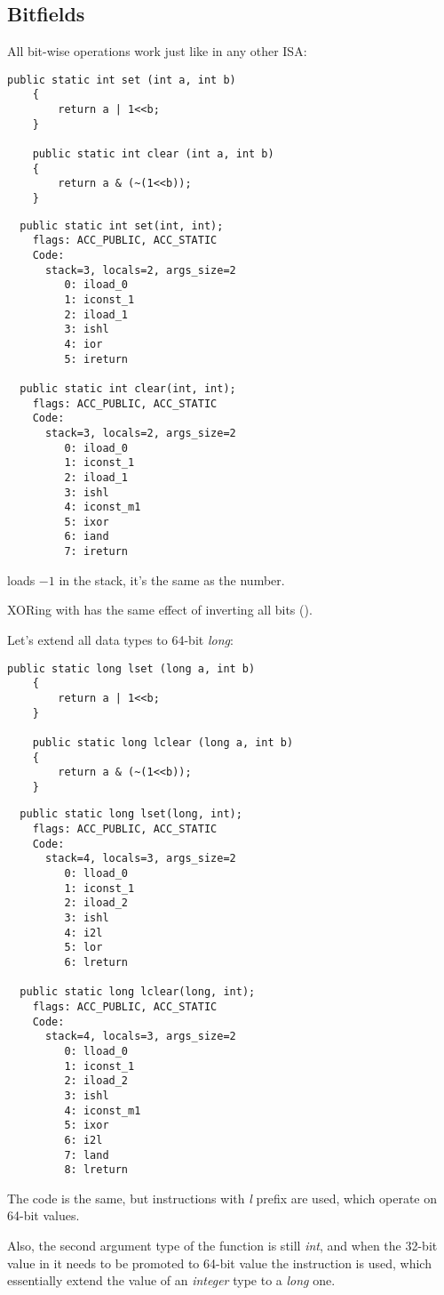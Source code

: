 \subsection{Bitfields}

All bit-wise operations work just like in any other \ac{ISA}:


\begin{lstlisting}[style=customjava]
	public static int set (int a, int b)
	{
		return a | 1<<b;
	}

	public static int clear (int a, int b)
	{
		return a & (~(1<<b));
	}
\end{lstlisting}

\begin{lstlisting}
  public static int set(int, int);
    flags: ACC_PUBLIC, ACC_STATIC
    Code:
      stack=3, locals=2, args_size=2
         0: iload_0
         1: iconst_1
         2: iload_1
         3: ishl
         4: ior
         5: ireturn

  public static int clear(int, int);
    flags: ACC_PUBLIC, ACC_STATIC
    Code:
      stack=3, locals=2, args_size=2
         0: iload_0
         1: iconst_1
         2: iload_1
         3: ishl
         4: iconst_m1
         5: ixor
         6: iand
         7: ireturn
\end{lstlisting}

 loads $-1$ in the stack, it's the same as the  number.

XORing with  has the same effect of inverting all bits
 ().

Let's extend all data types to 64-bit \emph{long}:


\begin{lstlisting}[style=customjava]
	public static long lset (long a, int b)
	{
		return a | 1<<b;
	}

	public static long lclear (long a, int b)
	{
		return a & (~(1<<b));
	}
\end{lstlisting}

\begin{lstlisting}
  public static long lset(long, int);
    flags: ACC_PUBLIC, ACC_STATIC
    Code:
      stack=4, locals=3, args_size=2
         0: lload_0
         1: iconst_1
         2: iload_2
         3: ishl
         4: i2l
         5: lor
         6: lreturn

  public static long lclear(long, int);
    flags: ACC_PUBLIC, ACC_STATIC
    Code:
      stack=4, locals=3, args_size=2
         0: lload_0
         1: iconst_1
         2: iload_2
         3: ishl
         4: iconst_m1
         5: ixor
         6: i2l
         7: land
         8: lreturn
\end{lstlisting}

The code is the same, but instructions with \emph{l} prefix are used, which operate
on 64-bit values.

Also, the second argument type of the function is still \emph{int}, and when the 32-bit value in it
needs to be promoted to 64-bit value the  instruction is used,
which essentially extend the value of an \emph{integer} type to a \emph{long} one.

